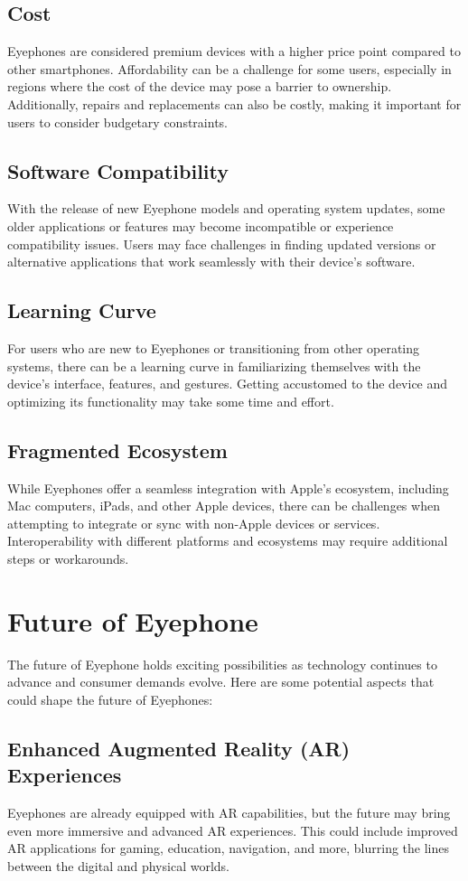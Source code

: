 \documentclass[a4paper,11pt]{report}
\begin{document}
\section{Cost}
Eyephones are considered premium devices with a higher price point compared to other smartphones. Affordability can be a challenge for some users, especially in regions where the cost of the device may pose a barrier to ownership. Additionally, repairs and replacements can also be costly, making it important for users to consider budgetary constraints.

\section{Software Compatibility}
With the release of new Eyephone models and operating system updates, some older applications or features may become incompatible or experience compatibility issues. Users may face challenges in finding updated versions or alternative applications that work seamlessly with their device's software.

\section{Learning Curve}
For users who are new to Eyephones or transitioning from other operating systems, there can be a learning curve in familiarizing themselves with the device's interface, features, and gestures. Getting accustomed to the device and optimizing its functionality may take some time and effort.

\section{Fragmented Ecosystem}
While Eyephones offer a seamless integration with Apple's ecosystem, including Mac computers, iPads, and other Apple devices, there can be challenges when attempting to integrate or sync with non-Apple devices or services. Interoperability with different platforms and ecosystems may require additional steps or workarounds.

\chapter{Future of Eyephone}
The future of Eyephone holds exciting possibilities as technology continues to advance and consumer demands evolve. Here are some potential aspects that could shape the future of Eyephones:

\section{Enhanced Augmented Reality (AR) Experiences}
 Eyephones are already equipped with AR capabilities, but the future may bring even more immersive and advanced AR experiences. This could include improved AR applications for gaming, education, navigation, and more, blurring the lines between the digital and physical worlds.
 
\end{document}
